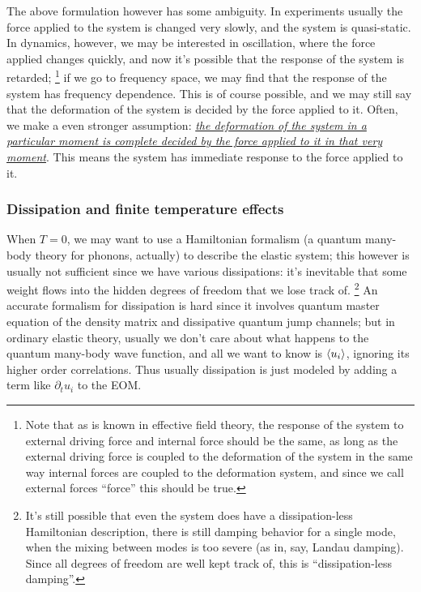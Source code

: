 \documentclass[hyperref, a4paper]{article}
\begin{document}
The above formulation however has some ambiguity.
In experiments usually the force applied to the system 
is changed very slowly,
and the system is quasi-static.
In dynamics, however, we may be interested in oscillation,
where the force applied changes quickly,
and now it's possible that the response of the system is retarded;%
\footnote{
    Note that as is known in effective field theory,
    the response of the system to external driving force 
    and internal force should be the same,
    as long as the external driving force is coupled to the 
    deformation of the system in the same way 
    internal forces are coupled to the deformation system,
    and since we call external forces ``force'' 
    this should be true.
}
if we go to frequency space,
we may find that the response of the system has frequency dependence.
This is of course possible,
and we may still say that 
the deformation of the system is decided by the force applied to it.
Often, we make a even stronger assumption:
\ul{\emph{the deformation of the system in a particular moment 
is complete decided by the force applied to it in that very moment}}.
This means the system has immediate response to the force applied to it.

\subsubsection{Dissipation and finite temperature effects}

When $T = 0$, we may want to use a Hamiltonian formalism 
(a quantum many-body theory for phonons, actually)
to describe the elastic system;
this however is usually not sufficient 
since we have various dissipations:
it's inevitable that some weight 
flows into the hidden degrees of freedom
that we lose track of.%
\footnote{
    It's still possible that even the system does have a 
    dissipation-less Hamiltonian description,
    there is still damping behavior for a single mode,
    when the mixing between modes is too severe 
    (as in, say, Landau damping).
    Since all degrees of freedom are well kept track of,
    this is ``dissipation-less damping''.
}
An accurate formalism for dissipation is hard 
since it involves quantum master equation of the density matrix 
and dissipative quantum jump channels;
but in ordinary elastic theory,
usually we don't care about  what happens to the quantum many-body wave function,
and all we want to know is $\expval{u_i}$,
ignoring its higher order correlations.
Thus usually dissipation is just modeled 
by adding a term like $\partial_t u_i$ to the EOM.
\end{document}
